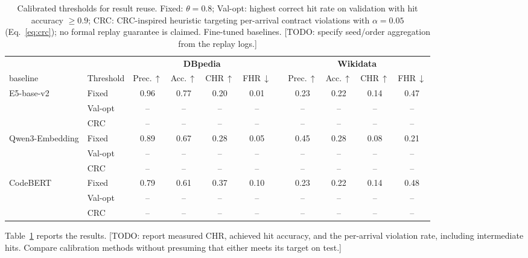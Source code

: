 \documentclass[runningheads]{llncs}
\newcommand{\hp}[1]{{\color{red!75!black}#1}}
\begin{document}
\begin{table}[t]
\centering
\caption{Calibrated thresholds for result reuse. Fixed: $\theta = 0.8$;
Val-opt: highest correct hit rate on validation with hit accuracy $\geq 0.9$;
CRC: CRC-inspired heuristic targeting per-arrival contract violations
with $\alpha = 0.05$ (Eq.~\ref{eq:crc}); no formal replay guarantee is claimed.
Fine-tuned baselines.
\hp{[TODO: specify seed/order aggregation from the replay logs.]}}
\label{tab:calibration}
\small
\setlength{\tabcolsep}{4pt}
\renewcommand{\arraystretch}{1.1}
\begin{adjustbox}{max width=\textwidth}
\begin{tabular}{ll cccc p{0pt} cccc}
\toprule
& & \multicolumn{4}{c}{\textbf{DBpedia}} & & \multicolumn{4}{c}{\textbf{Wikidata}}\\
\cmidrule(lr){3-6}\cmidrule(lr){8-11}
baseline & Threshold & Prec.\,$\uparrow$ & Acc.\,$\uparrow$ & CHR\,$\uparrow$ & FHR\,$\downarrow$ & & Prec.\,$\uparrow$ & Acc.\,$\uparrow$ & CHR\,$\uparrow$ & FHR\,$\downarrow$\\
\midrule
E5-base-v2 & Fixed & 0.96 & 0.77 & 0.20 & 0.01 & & 0.23 & 0.22 & 0.14 & 0.47 \\
 & Val-opt & \hp{--} & \hp{--} & \hp{--} & \hp{--} & & \hp{--} & \hp{--} & \hp{--} & \hp{--} \\
 & CRC & \hp{--} & \hp{--} & \hp{--} & \hp{--} & & \hp{--} & \hp{--} & \hp{--} & \hp{--} \\
\midrule
Qwen3-Embedding & Fixed & 0.89 & 0.67 & 0.28 & 0.05 & & 0.45 & 0.28 & 0.08 & 0.21 \\
 & Val-opt & \hp{--} & \hp{--} & \hp{--} & \hp{--} & & \hp{--} & \hp{--} & \hp{--} & \hp{--} \\
 & CRC & \hp{--} & \hp{--} & \hp{--} & \hp{--} & & \hp{--} & \hp{--} & \hp{--} & \hp{--} \\
\midrule
CodeBERT & Fixed & 0.79 & 0.61 & 0.37 & 0.10 & & 0.23 & 0.22 & 0.14 & 0.48 \\
 & Val-opt & \hp{--} & \hp{--} & \hp{--} & \hp{--} & & \hp{--} & \hp{--} & \hp{--} & \hp{--} \\
 & CRC & \hp{--} & \hp{--} & \hp{--} & \hp{--} & & \hp{--} & \hp{--} & \hp{--} & \hp{--} \\
\bottomrule
\end{tabular}
\end{adjustbox}
\end{table}

Table~\ref{tab:calibration} reports the results.
\hp{[TODO: report measured CHR, achieved hit accuracy, and the per-arrival
violation rate, including intermediate hits. Compare calibration methods
without presuming that either meets its target on test.]}
\end{document}
